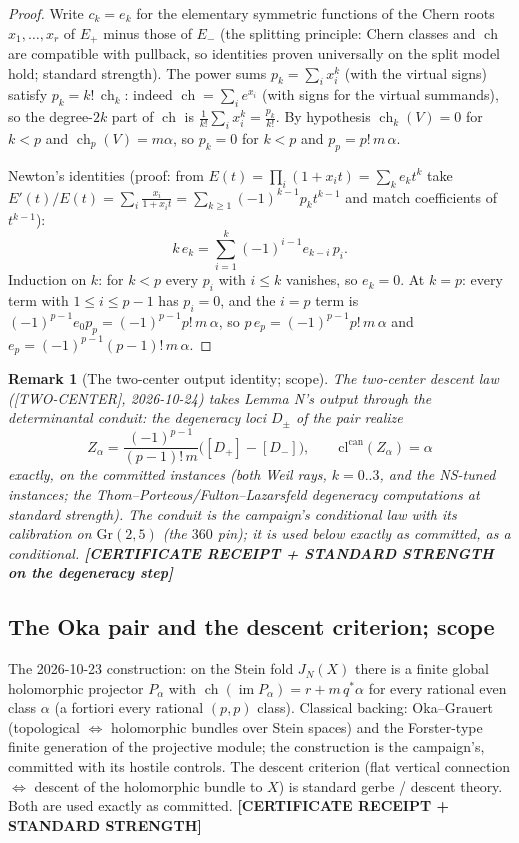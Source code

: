 \documentclass[11pt]{article}
\newtheorem{remark}[theorem]{Remark}
\newcommand{\ch}{\operatorname{ch}}
\newcommand{\im}{\operatorname{im}}
\begin{document}
\begin{proof}
Write $c_k=e_k$ for the elementary symmetric functions of the Chern
roots $x_1,\dots,x_r$ of $E_+$ minus those of $E_-$ (the splitting
principle: Chern classes and $\ch$ are compatible with pullback, so
identities proven universally on the split model hold; standard
strength). The power sums
$p_k=\sum_i x_i^k$ (with the virtual signs) satisfy
$p_k=k!\,\ch_k$: indeed $\ch=\sum_i e^{x_i}$ (with signs for the
virtual summands), so the degree-$2k$ part of $\ch$ is
$\frac1{k!}\sum_i x_i^k=\frac{p_k}{k!}$. By hypothesis
$\ch_k(V)=0$ for $k<p$ and $\ch_p(V)=m\alpha$, so $p_k=0$ for $k<p$
and $p_p=p!\,m\,\alpha$.

Newton's identities (proof: from
$E(t)=\prod_i(1+x_it)=\sum_k e_kt^k$ take
$E'(t)/E(t)=\sum_i\frac{x_i}{1+x_it}
=\sum_{k\ge1}(-1)^{k-1}p_kt^{k-1}$ and match coefficients of
$t^{k-1}$):
\[
k\,e_k=\sum_{i=1}^{k}(-1)^{i-1}e_{k-i}\,p_i .
\]
Induction on $k$: for $k<p$ every $p_i$ with $i\le k$ vanishes, so
$e_k=0$. At $k=p$: every term with $1\le i\le p-1$ has $p_i=0$, and
the $i=p$ term is $(-1)^{p-1}e_0p_p=(-1)^{p-1}p!\,m\,\alpha$, so
$p\,e_p=(-1)^{p-1}p!\,m\,\alpha$ and
$e_p=(-1)^{p-1}(p-1)!\,m\,\alpha$.
\end{proof}

\begin{remark}[The two-center output identity; scope]
The two-center descent law ([TWO-CENTER], 2026-10-24) takes Lemma N's
output through the determinantal conduit: the degeneracy loci
$D_\pm$ of the pair realize
\[
Z_\alpha=\frac{(-1)^{p-1}}{(p-1)!\,m}\big([D_+]-[D_-]\big),
\qquad \mathrm{cl}^{\mathrm{can}}(Z_\alpha)=\alpha
\]
exactly, on the committed instances (both Weil rays, $k=0..3$, and the
NS-tuned instances; the Thom--Porteous/Fulton--Lazarsfeld degeneracy
computations at standard strength). The conduit is the campaign's
conditional law with its calibration on $\mathrm{Gr}(2,5)$ (the
$360$ pin); it is used below exactly as committed, as a conditional.
\textbf{[CERTIFICATE RECEIPT + STANDARD STRENGTH on the degeneracy
step]}
\end{remark}

\subsection{The Oka pair and the descent criterion; scope}

The 2026-10-23 construction: on the Stein fold $J_N(X)$ there is a
finite global holomorphic projector $P_\alpha$ with
$\ch(\im P_\alpha)=r+m\,q^*\alpha$ for every rational even class
$\alpha$ (a fortiori every rational $(p,p)$ class). Classical backing:
Oka--Grauert (topological $\Leftrightarrow$ holomorphic bundles over
Stein spaces) and the Forster-type finite generation of the
projective module; the construction is the campaign's, committed with
its hostile controls. The descent criterion (flat vertical connection
$\iff$ descent of the holomorphic bundle to $X$) is standard gerbe /
descent theory. Both are used exactly as committed.
\textbf{[CERTIFICATE RECEIPT + STANDARD STRENGTH]}
\end{document}

